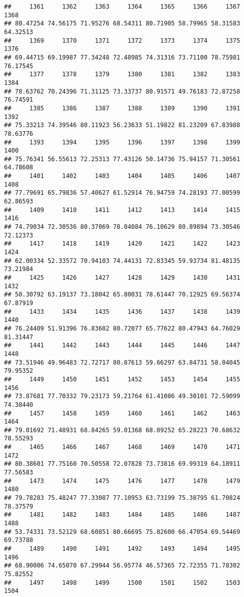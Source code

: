 \documentclass[
]{article}
\begin{document}
\begin{verbatim}
##     1361     1362     1363     1364     1365     1366     1367     1368 
## 80.47254 74.56175 71.95276 68.54311 80.71905 58.79965 58.31583 64.32513 
##     1369     1370     1371     1372     1373     1374     1375     1376 
## 69.44715 69.19987 77.34248 72.48985 74.31316 73.71100 78.75981 76.17545 
##     1377     1378     1379     1380     1381     1382     1383     1384 
## 78.63762 70.24396 71.31125 73.33737 80.91571 49.76183 72.87258 76.74591 
##     1385     1386     1387     1388     1389     1390     1391     1392 
## 75.33213 74.39546 80.11923 56.23633 51.19822 81.23209 67.83988 78.63776 
##     1393     1394     1395     1396     1397     1398     1399     1400 
## 75.76341 56.55613 72.25313 77.43126 50.14736 75.94157 71.30561 64.78608 
##     1401     1402     1403     1404     1405     1406     1407     1408 
## 77.79691 65.79836 57.40627 61.52914 76.94759 74.28193 77.00599 62.86593 
##     1409     1410     1411     1412     1413     1414     1415     1416 
## 74.79034 72.30536 80.37069 78.04084 76.10629 80.89894 73.30546 72.12373 
##     1417     1418     1419     1420     1421     1422     1423     1424 
## 62.00334 52.33572 70.94103 74.44131 72.83345 59.93734 81.48135 73.21984 
##     1425     1426     1427     1428     1429     1430     1431     1432 
## 50.30792 63.19137 73.18042 65.80031 78.61447 70.12925 69.56374 67.87919 
##     1433     1434     1435     1436     1437     1438     1439     1440 
## 76.24409 51.91396 76.83602 80.72077 65.77622 80.47943 64.76029 81.31447 
##     1441     1442     1443     1444     1445     1446     1447     1448 
## 73.51946 49.96483 72.72717 80.87613 59.66297 63.84731 58.04045 79.95352 
##     1449     1450     1451     1452     1453     1454     1455     1456 
## 73.87681 77.70332 79.23173 59.21764 61.41086 49.30101 72.59099 74.38440 
##     1457     1458     1459     1460     1461     1462     1463     1464 
## 79.01692 71.48931 68.84265 59.01368 68.89252 65.28223 70.68632 78.55293 
##     1465     1466     1467     1468     1469     1470     1471     1472 
## 80.38601 77.75160 70.50558 72.07828 73.73816 69.99319 64.18911 77.56583 
##     1473     1474     1475     1476     1477     1478     1479     1480 
## 79.78283 75.48247 77.33087 77.10953 63.73199 75.38795 61.70824 78.37579 
##     1481     1482     1483     1484     1485     1486     1487     1488 
## 53.74331 73.52129 68.60851 80.66695 75.82600 66.47054 69.54469 69.73788 
##     1489     1490     1491     1492     1493     1494     1495     1496 
## 68.90006 74.65070 67.29944 56.95774 46.57365 72.72355 71.78302 75.82552 
##     1497     1498     1499     1500     1501     1502     1503     1504 

\end{verbatim}
\end{document}

